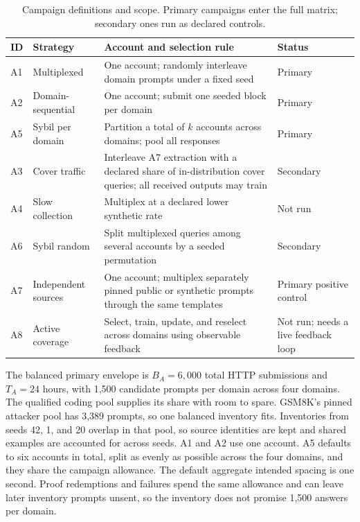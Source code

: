 \documentclass[journal]{IEEEtran}
\begin{document}
\begin{table}[!t]
\centering\footnotesize
\caption{Campaign definitions and scope. Primary campaigns enter the full matrix; secondary ones run as declared controls.}
\label{tab:schedules}
\begin{tabularx}{\textwidth}{@{}llYY@{}}\toprule
ID & Strategy & Account and selection rule & Status \\\midrule
A1 & Multiplexed & One account; randomly interleave domain prompts under a fixed seed & Primary \\
A2 & Domain-sequential & One account; submit one seeded block per domain & Primary \\
A5 & Sybil per domain & Partition a total of $k$ accounts across domains; pool all responses & Primary \\
A3 & Cover traffic & Interleave A7 extraction with a declared share of in-distribution cover queries; all received outputs may train & Secondary \\
A4 & Slow collection & Multiplex at a declared lower synthetic rate & Not run \\
A6 & Sybil random & Split multiplexed queries among several accounts by a seeded permutation & Secondary \\
A7 & Independent sources & One account; multiplex separately pinned public or synthetic prompts through the same templates & Primary positive control \\
A8 & Active coverage & Select, train, update, and reselect across domains using observable feedback & Not run; needs a live feedback loop \\\bottomrule
\end{tabularx}
\end{table}

The balanced primary envelope is $B_A=6{,}000$ total HTTP submissions and $T_A=24$ hours, with 1,500 candidate prompts per domain across four domains. The qualified coding pool supplies its share with room to spare. GSM8K's pinned attacker pool has 3,389 prompts, so one balanced inventory fits. Inventories from seeds 42, 1, and 20 overlap in that pool, so source identities are kept and shared examples are accounted for across seeds. A1 and A2 use one account. A5 defaults to six accounts in total, split as evenly as possible across the four domains, and they share the campaign allowance. The default aggregate intended spacing is one second. Proof redemptions and failures spend the same allowance and can leave later inventory prompts unsent, so the inventory does not promise 1,500 answers per domain.
\end{document}
